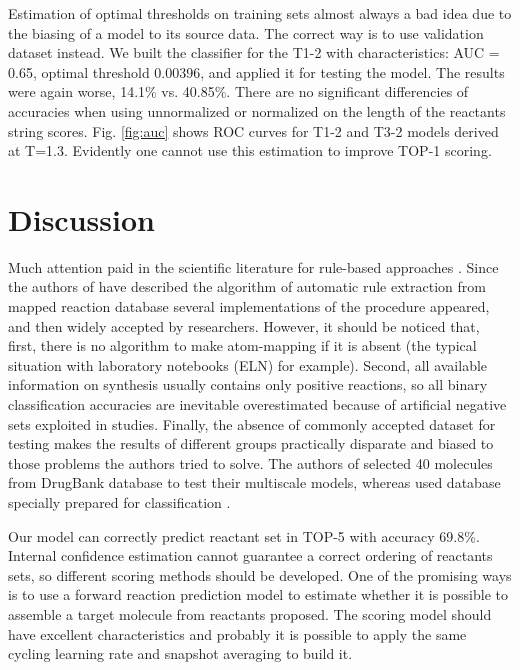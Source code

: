\documentclass{article}
\begin{document}
Estimation of optimal thresholds on training sets almost always a bad idea due to the biasing of a model to its source data. The correct way is to use validation dataset instead. We built the classifier for the T1-2 with characteristics: AUC = 0.65, optimal threshold 0.00396, and applied it for testing the model. The results were again worse, 14.1\% vs. 40.85\%. There are no significant differencies of accuracies when using unnormalized or normalized on the length of the reactants string scores. Fig. \ref{fig:auc} shows ROC curves for T1-2 and T3-2 models derived at T=1.3. 
Evidently one cannot use this estimation to improve TOP-1 scoring. 

\section{Discussion}

Much attention paid in the scientific literature for rule-based approaches \cite{Preuss,Baylon}. Since the authors of \cite{Rules} have described the algorithm of automatic rule extraction from mapped reaction database several implementations of the procedure appeared, and then widely accepted by researchers. However, it should be noticed that, first, there is no algorithm to make atom-mapping \cite{BaskinReview} if it is absent (the typical situation with laboratory notebooks (ELN) for example). Second, all available information on synthesis usually contains only positive reactions, so all binary classification accuracies are inevitable overestimated because of artificial negative sets exploited in studies. Finally, the absence of commonly accepted dataset for testing makes the results of different groups practically disparate and  biased to those problems the authors tried to solve. The authors of   \cite{Baylon} selected 40 molecules from DrugBank database to test their multiscale models, whereas \cite{Pande} used database specially prepared for classification \cite{Schneider}.  

Our model can correctly predict reactant set in TOP-5 with accuracy 69.8\%. Internal confidence estimation cannot guarantee a correct ordering of reactants sets, so different scoring methods should be developed. One of the promising ways is to use a forward reaction prediction model to estimate whether it is possible to assemble a target molecule from reactants proposed. The scoring model should have excellent characteristics and probably it is possible to apply the same cycling learning rate and snapshot averaging to build it. 
\end{document}
